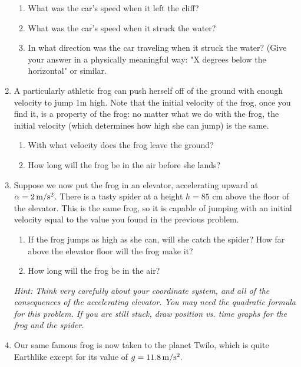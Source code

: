 \documentclass[12pt]{article}
\begin{document}
\begin{enumerate}
\begin{enumerate}
\item What was the car's speed when it left the cliff?
\item What was the car's speed when it struck the water?
\item In what direction was the car traveling when it struck the water? (Give your answer in a physically meaningful way: "X degrees below the horizontal" or similar.
\end{enumerate}

\item A particularly athletic frog can push herself off of the ground with enough velocity to jump 1m high. Note that the initial velocity of the frog, once you find it, is a property of the frog: no matter what we do with the frog, the initial velocity (which determines how high she can jump) is the same.

\begin{enumerate}
\item With what velocity does the frog leave the ground?
\item How long will the frog be in the air before she lands?
\end{enumerate}

\item Suppose we now put the frog in an elevator, accelerating upward at $\alpha=2\, \rm m/\rm s^2$. There is a tasty spider at a height $h=85$ cm above the floor of the elevator. This is the same frog, so it is capable of jumping with an initial velocity equal to the value you found in the previous problem.

\begin{enumerate}
\item If the frog jumps as high as she can, will she catch the spider? How far above the elevator floor will the frog make it?
\item How long will the frog be in the air?
\end{enumerate}

{\it Hint: Think very carefully about your coordinate system, and all of the consequences of the accelerating elevator. You may need the quadratic formula for this problem. If you are still stuck, draw position vs. time graphs for the frog and the spider.}

\item Our same famous frog is now taken to the planet Twilo, which is quite Earthlike except for its value of $g=11.8\, \rm m/\rm s^2.$


\end{enumerate}
\end{document}

